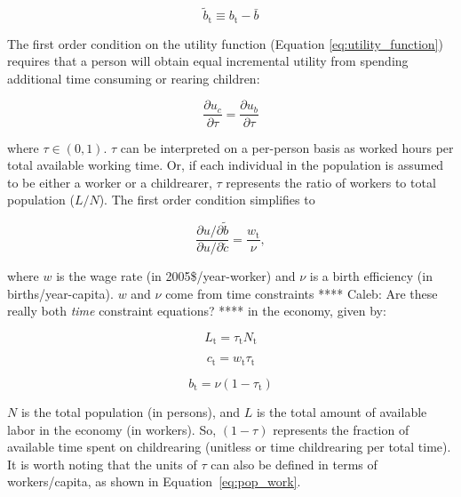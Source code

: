 \documentclass[letterpaper,12pt]{article}
\begin{document}
\begin{equation} \label{eq:b_tilde}
	\tilde b_\mathrm{t} \equiv b_\mathrm{t} - \bar b
\end{equation}

The first order condition on the utility function (Equation \ref{eq:utility_function}) requires that a person will obtain equal incremental utility from spending additional time consuming or rearing children:

\begin{equation} \label{eq:first_order_condition_def}
	\frac{\partial u_{c}}{\partial \tau} = \frac{\partial u_{b}}{\partial \tau}
\end{equation}

\noindent where $\tau \in (0,1)$. $\tau$ can be interpreted on a per-person basis as worked hours per total available working time. Or, if each individual in the population is assumed to be either a worker or a childrearer, $\tau$ represents the ratio of workers to total population ($L/N$). The first order condition simplifies to 

\begin{equation} \label{eq:first_order_condition_simplified}
	\frac{\partial u/ \partial\tilde b}{\partial u/ \partial\tilde c} = \frac{w_\mathrm{t}}{\nu},
\end{equation}

\noindent where $w$ is the wage rate (in 2005\$/year-worker) and $\nu$ is a birth efficiency (in births/year-capita). $w$ and $\nu$ come from time constraints **** Caleb: Are these really both \emph{time} constraint equations? **** in the economy, given by:

\begin{equation}\label{eq:pop_work}
	L_\mathrm{t} = \tau_\mathrm{t} N_\mathrm{t}
\end{equation}

\begin{equation} \label{eq:consumption_constraint}
	c_\mathrm{t} = w_\mathrm{t} \tau_\mathrm{t}
\end{equation}

\begin{equation} \label{eq:birth_constraint}
	b_\mathrm{t} = \nu (1-\tau_\mathrm{t})
\end{equation}

\noindent $N$ is the total population (in persons), and $L$ is the total amount of available labor in the economy (in workers). So, $(1-\tau)$ represents the fraction of available time spent on childrearing (unitless or time childrearing per total time). It is worth noting that the units of $\tau$ can also be defined in terms of workers/capita, as shown in Equation~\ref{eq:pop_work}.
\end{document}
